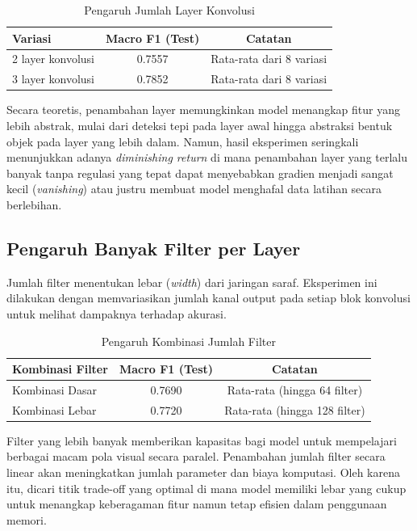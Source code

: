 \begin{table}[H]
	\centering
	\caption{Pengaruh Jumlah Layer Konvolusi}
	\begin{tabular}{lcc}
		\toprule
		\textbf{Variasi} & \textbf{Macro F1 (Test)} & \textbf{Catatan} \\
		\midrule
		2 layer konvolusi & 0.7557 & Rata-rata dari 8 variasi \\
		3 layer konvolusi & 0.7852 & Rata-rata dari 8 variasi \\
		\bottomrule
	\end{tabular}
	\label{tab:cnn-var-depth}
\end{table}

Secara teoretis, penambahan layer memungkinkan model menangkap fitur yang lebih abstrak, mulai dari deteksi tepi pada layer awal hingga abstraksi bentuk objek pada layer yang lebih dalam. Namun, hasil eksperimen seringkali menunjukkan adanya \textit{diminishing return} di mana penambahan layer yang terlalu banyak tanpa regulasi yang tepat dapat menyebabkan gradien menjadi sangat kecil (\textit{vanishing}) atau justru membuat model menghafal data latihan secara berlebihan.

\subsection{Pengaruh Banyak Filter per Layer}

Jumlah filter menentukan lebar (\textit{width}) dari jaringan saraf. Eksperimen ini dilakukan dengan memvariasikan jumlah kanal output pada setiap blok konvolusi untuk melihat dampaknya terhadap akurasi.

\begin{table}[H]
	\centering
	\caption{Pengaruh Kombinasi Jumlah Filter}
	\begin{tabular}{lcc}
		\toprule
		\textbf{Kombinasi Filter} & \textbf{Macro F1 (Test)} & \textbf{Catatan} \\
		\midrule
		Kombinasi Dasar & 0.7690 & Rata-rata (hingga 64 filter) \\
		Kombinasi Lebar & 0.7720 & Rata-rata (hingga 128 filter) \\
		\bottomrule
	\end{tabular}
	\label{tab:cnn-var-filter-count}
\end{table}

Filter yang lebih banyak memberikan kapasitas bagi model untuk mempelajari berbagai macam pola visual secara paralel. Penambahan jumlah filter secara linear akan meningkatkan jumlah parameter dan biaya komputasi. Oleh karena itu, dicari titik trade-off yang optimal di mana model memiliki lebar yang cukup untuk menangkap keberagaman fitur namun tetap efisien dalam penggunaan memori.

